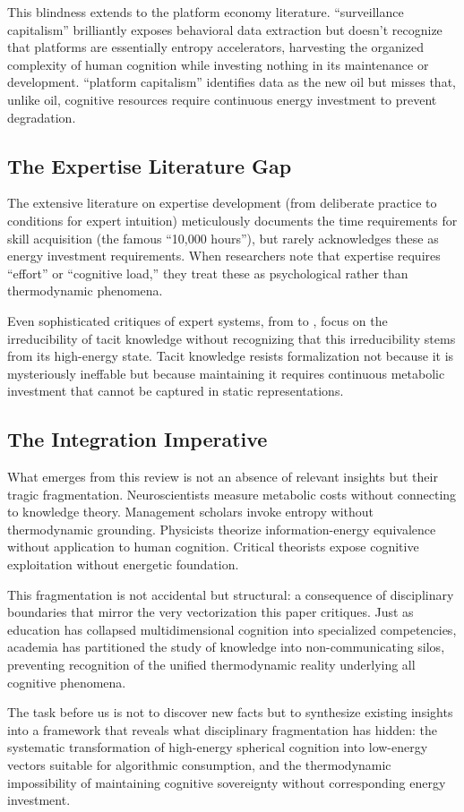 This blindness extends to the platform economy literature. \citet{zuboff2019} ``surveillance capitalism'' brilliantly exposes behavioral data extraction but doesn't recognize that platforms are essentially entropy accelerators, harvesting the organized complexity of human cognition while investing nothing in its maintenance or development. \citet{srnicek2017} ``platform capitalism'' identifies data as the new oil but misses that, unlike oil, cognitive resources require continuous energy investment to prevent degradation.

\subsection{The Expertise Literature Gap}

The extensive literature on expertise development (from \citet{ericsson2006} deliberate practice to \citet{kahneman2009} conditions for expert intuition) meticulously documents the time requirements for skill acquisition (the famous ``10,000 hours''), but rarely acknowledges these as energy investment requirements. When researchers note that expertise requires ``effort'' or ``cognitive load,'' they treat these as psychological rather than thermodynamic phenomena.

Even sophisticated critiques of expert systems, from \citet{dreyfus1979} to \citet{collins2010}, focus on the irreducibility of tacit knowledge without recognizing that this irreducibility stems from its high-energy state. Tacit knowledge resists formalization not because it is mysteriously ineffable but because maintaining it requires continuous metabolic investment that cannot be captured in static representations.

\subsection{The Integration Imperative}

What emerges from this review is not an absence of relevant insights but their tragic fragmentation. Neuroscientists measure metabolic costs without connecting to knowledge theory. Management scholars invoke entropy without thermodynamic grounding. Physicists theorize information-energy equivalence without application to human cognition. Critical theorists expose cognitive exploitation without energetic foundation.

This fragmentation is not accidental but structural: a consequence of disciplinary boundaries that mirror the very vectorization this paper critiques. Just as education has collapsed multidimensional cognition into specialized competencies, academia has partitioned the study of knowledge into non-communicating silos, preventing recognition of the unified thermodynamic reality underlying all cognitive phenomena.

The task before us is not to discover new facts but to synthesize existing insights into a framework that reveals what disciplinary fragmentation has hidden: the systematic transformation of high-energy spherical cognition into low-energy vectors suitable for algorithmic consumption, and the thermodynamic impossibility of maintaining cognitive sovereignty without corresponding energy investment.
